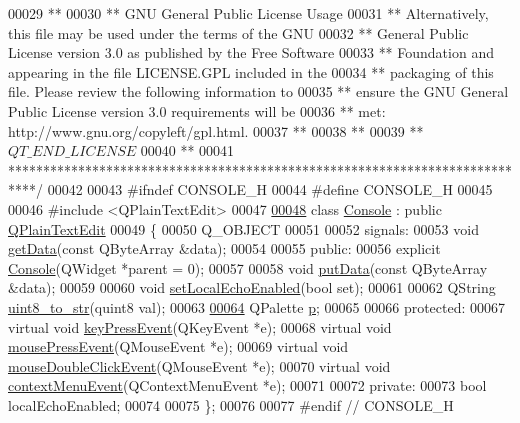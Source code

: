 \begin{DoxyCode}
00029 \textcolor{comment}{**}
00030 \textcolor{comment}{** GNU General Public License Usage}
00031 \textcolor{comment}{** Alternatively, this file may be used under the terms of the GNU}
00032 \textcolor{comment}{** General Public License version 3.0 as published by the Free Software}
00033 \textcolor{comment}{** Foundation and appearing in the file LICENSE.GPL included in the}
00034 \textcolor{comment}{** packaging of this file.  Please review the following information to}
00035 \textcolor{comment}{** ensure the GNU General Public License version 3.0 requirements will be}
00036 \textcolor{comment}{** met: http://www.gnu.org/copyleft/gpl.html.}
00037 \textcolor{comment}{**}
00038 \textcolor{comment}{**}
00039 \textcolor{comment}{** $QT\_END\_LICENSE$}
00040 \textcolor{comment}{**}
00041 \textcolor{comment}{****************************************************************************/}
00042 
00043 \textcolor{preprocessor}{#ifndef CONSOLE\_H}
00044 \textcolor{preprocessor}{#define CONSOLE\_H}
00045 
00046 \textcolor{preprocessor}{#include <QPlainTextEdit>}
00047 
\hypertarget{a00088_source_l00048}{}\hyperlink{a00005}{00048} \textcolor{keyword}{class }\hyperlink{a00005}{Console} : \textcolor{keyword}{public} \hyperlink{a00061}{QPlainTextEdit}
00049 \{
00050     Q\_OBJECT
00051 
00052 signals:
00053     \textcolor{keywordtype}{void} \hyperlink{a00005_a1976aad46ce1a77be730bc628275038f}{getData}(\textcolor{keyword}{const} QByteArray &data);
00054 
00055 \textcolor{keyword}{public}:
00056     \textcolor{keyword}{explicit} \hyperlink{a00005_a1219e6e2000327a02434c56c514bbeda}{Console}(QWidget *parent = 0);
00057 
00058     \textcolor{keywordtype}{void} \hyperlink{a00005_aa744a0868e01a13a502710f895f01525}{putData}(\textcolor{keyword}{const} QByteArray &data);
00059 
00060     \textcolor{keywordtype}{void} \hyperlink{a00005_a5a17c5b6bc6719a26f73a5d0ac3d7de1}{setLocalEchoEnabled}(\textcolor{keywordtype}{bool} set);
00061 
00062     QString \hyperlink{a00005_a9194022b884875614a4f7056454881c1}{uint8\_to\_str}(quint8 val);
00063 
\hypertarget{a00088_source_l00064}{}\hyperlink{a00005_a097b52858dc4b9f1bec8d8d67518daf0}{00064}     QPalette \hyperlink{a00005_a097b52858dc4b9f1bec8d8d67518daf0}{p};
00065 
00066 \textcolor{keyword}{protected}:
00067     \textcolor{keyword}{virtual} \textcolor{keywordtype}{void} \hyperlink{a00005_a558b58e3e68a167a7897a77bee78536c}{keyPressEvent}(QKeyEvent *e);
00068     \textcolor{keyword}{virtual} \textcolor{keywordtype}{void} \hyperlink{a00005_a615736fd63c7fc70536e2b775b0ce745}{mousePressEvent}(QMouseEvent *e);
00069     \textcolor{keyword}{virtual} \textcolor{keywordtype}{void} \hyperlink{a00005_a1727cadc147a07ed86fd4cb91908fd5f}{mouseDoubleClickEvent}(QMouseEvent *e);
00070     \textcolor{keyword}{virtual} \textcolor{keywordtype}{void} \hyperlink{a00005_a199dade448d3ae597d420dc65abca11c}{contextMenuEvent}(QContextMenuEvent *e);
00071 
00072 \textcolor{keyword}{private}:
00073     \textcolor{keywordtype}{bool} localEchoEnabled;
00074 
00075 \};
00076 
00077 \textcolor{preprocessor}{#endif // CONSOLE\_H}
\end{DoxyCode}
